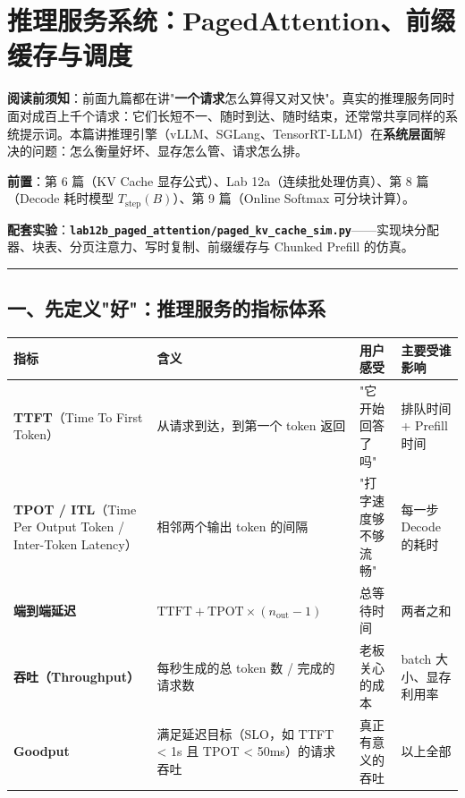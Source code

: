 \chapter{推理服务系统：PagedAttention、前缀缓存与调度}

\begin{noteBox}[核心导读与背景]
\textbf{阅读前须知}：前面九篇都在讲"\textbf{一个请求}怎么算得又对又快"。真实的推理服务同时面对成百上千个请求：它们长短不一、随时到达、随时结束，还常常共享同样的系统提示词。本篇讲推理引擎（vLLM、SGLang、TensorRT-LLM）在\textbf{系统层面}解决的问题：怎么衡量好坏、显存怎么管、请求怎么排。

\textbf{前置}：第 6 篇（KV Cache 显存公式）、Lab 12a（连续批处理仿真）、第 8 篇（Decode 耗时模型 $T_{\text{step}}(B)$）、第 9 篇（Online Softmax 可分块计算）。

\textbf{配套实验}：\textbf{\texttt{lab12b\_paged\_attention/paged\_kv\_cache\_sim.py}}——实现块分配器、块表、分页注意力、写时复制、前缀缓存与 Chunked Prefill 的仿真。
\end{noteBox}

\vspace{0.8em}\hrule\vspace{0.8em}

\section{一、先定义"好"：推理服务的指标体系}

\begin{center}
\small
\begin{tabularx}{\textwidth}{p{2.5cm} p{3.5cm} X X}
\toprule
\textbf{指标} & \textbf{含义} & \textbf{用户感受} & \textbf{主要受谁影响} \\
\midrule
\textbf{TTFT}（Time To First Token） & 从请求到达，到第一个 token 返回 & "它开始回答了吗" & 排队时间 + Prefill 时间 \\
\textbf{TPOT / ITL}（Time Per Output Token / Inter-Token Latency） & 相邻两个输出 token 的间隔 & "打字速度够不够流畅" & 每一步 Decode 的耗时 \\
\textbf{端到端延迟} & $\text{TTFT} + \text{TPOT} \times (n_{\text{out}} - 1)$ & 总等待时间 & 两者之和 \\
\textbf{吞吐（Throughput）} & 每秒生成的总 token 数 / 完成的请求数 & 老板关心的成本 & batch 大小、显存利用率 \\
\textbf{Goodput} & 满足延迟目标（SLO，如 TTFT < 1s 且 TPOT < 50ms）的请求吞吐 & 真正有意义的吞吐 & 以上全部 \\
\bottomrule
\end{tabularx}
\end{center}


